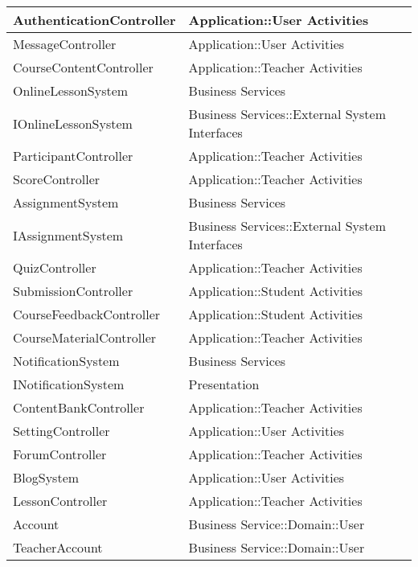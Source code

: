 \documentclass[./../main_file.tex]{subfiles}
\begin{document}
\begin{longtable}{|p{.5\linewidth}|p{.5\linewidth}|}
		AuthenticationController & Application::User Activities                  \\ \hline
		MessageController        & Application::User Activities                  \\ \hline
		CourseContentController  & Application::Teacher Activities               \\ \hline
		OnlineLessonSystem       & Business Services                             \\ \hline
		IOnlineLessonSystem      & Business Services::External System Interfaces \\ \hline
		ParticipantController    & Application::Teacher Activities               \\ \hline
		ScoreController          & Application::Teacher Activities               \\ \hline
		AssignmentSystem         & Business Services                             \\ \hline
		IAssignmentSystem        & Business Services::External System Interfaces \\ \hline
		QuizController           & Application::Teacher Activities               \\ \hline
		SubmissionController     & Application::Student Activities               \\ \hline
		CourseFeedbackController & Application::Student Activities               \\ \hline
		CourseMaterialController & Application::Teacher Activities               \\ \hline
		NotificationSystem       & Business Services                             \\ \hline
		INotificationSystem      & Presentation                      \\ \hline
		ContentBankController    & Application::Teacher Activities \\ \hline
		SettingController        & Application::User Activities                  \\ \hline
		ForumController          & Application::Teacher Activities \\ \hline
		BlogSystem               & Application::User Activities                  \\ \hline
		LessonController         & Application::Teacher Activities               \\ \hline
		Account                  & Business Service::Domain::User                \\ \hline
		TeacherAccount           & Business Service::Domain::User                \\ \hline

\end{longtable}
\end{document}
